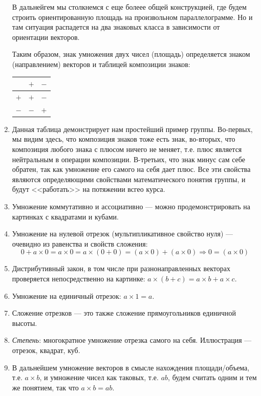 \begin{enumerate}
В дальнейгем мы столкнемся с еще болеее общей конструкцией, где будем строить ориентированную площадь на произвольном параллелограмме. Но и там ситуация распадется на два знаковых класса в зависимости от ориентации векторов.

Таким образом, знак умножения двух чисел (площадь) определяется знаком (направлением) векторов и таблицей композиции знаков:
\begin{center}
\begin{tabular}{c|c|c|}
  & $+$ & $-$ \\
 \hline
$+$ & $+$ & $-$ \\
 \hline
$-$ & $-$ & $+$ \\
\hline
\end{tabular}
\end{center}
\item Данная таблица демонстрирует нам простейший пример группы. Во-первых, мы видим здесь, что композиция знаков тоже есть знак, во-вторых, что композиция любого знака с плюсом ничего не меняет, т.е. плюс является нейтральным в операции композиции. В-третьих, что знак минус сам себе обратен, так как умножение его самого на себя дает плюс. Все эти свойства являются определяющими свойствами математического понятия группы, и будут <<работать>> на потяжении всгео курса.

\item Умножение коммутативно и ассоциативно --- можно продемонстрировать на картинках с квадратами и кубами.
\item Умножение на нулевой отрезок (мультипликативное свойство нуля) --- очевидно из равенства и свойств сложения:
$$
0 + a\times 0 = a\times 0 = a\times (0+0) = (a\times 0) + (a\times 0)\Rightarrow 0 = (a\times 0)
$$
\item Дистрибутивный закон, в том числе при разнонаправленных векторах проверяется непосредственно на картинке: $a\times (b+c)=a\times b+a\times c$.
\item Умножение на единичный отрезок: $a\times 1=a$.
\item Сложение отрезков --- это также сложение прямоугольников единичной высоты.
\item \textit{Степень}: многократное умножение отрезка самого на себя. Иллюстрация --- отрезок, квадрат, куб.
\item В дальнейшем умножение векторов в смысле нахождения площади/объема, т.е. $a\times b$, и умножение чисел как таковых, т.е. $ab$, будем считать одним и тем же понятием, так что $a\times b=ab$.
\end{enumerate}

